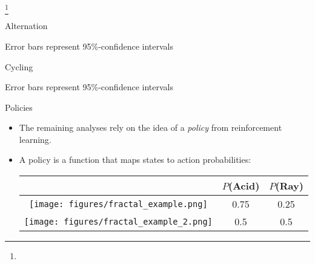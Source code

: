 \documentclass{beamer}
\newcommand\blfootnote[1]{%
  \begingroup
  \renewcommand\thefootnote{}\footnote{#1}%
  \addtocounter{footnote}{-1}%
  \endgroup
}
\begin{document}
\begin{frame}[allowframebreaks]

\blfootnote{}
\end{frame}

\appendix


\begin{frame}{Alternation}
\begin{figure}
\centering
{} 
\end{figure}
{\scriptsize Error bars represent 95\%-confidence intervals}
\end{frame}


\begin{frame}{Cycling}
\begin{figure}
\centering
{} 
\end{figure}
{\scriptsize Error bars represent 95\%-confidence intervals}
\end{frame}

\begin{frame}{Policies}
\begin{itemize}
\item The remaining analyses rely on the idea of a \emph{policy} from reinforcement learning.
\item<2-> A policy is a function that maps states to action probabilities:
\begin{center}
\begin{table}

\begin{tabular}{|c|c|c|}
\hline 
& \(P\)(Acid) & \(P\)(Ray) \\
\hline
\texttt{[image: figures/fractal\_example.png]} & 0.75 & 0.25\\ \hline
\texttt{[image: figures/fractal\_example\_2.png]} & 0.5 & 0.5 \\ \hline
\end{tabular}
\end{table}
\end{center}
\end{itemize}
\end{frame}
\end{document}
